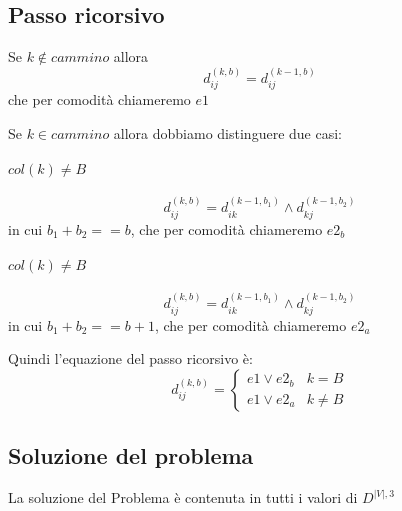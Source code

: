 \documentclass[12pt, a4paper, openany]{book}
\begin{document}
\subsection*{Passo ricorsivo}
Se $k \notin cammino$ allora
\begin{equation*}
	d_{ij}^{(k,b)} = d_{ij}^{(k-1,b)}
\end{equation*}
che per comodità chiameremo $e1$

Se $k \in cammino$ allora dobbiamo distinguere due casi:
\paragraph{$col(k) \neq B$}
\begin{equation*}
	d_{ij}^{(k,b)} = d_{ik}^{(k-1,b_1)} \land d_{kj}^{(k-1,b_2)}
\end{equation*}
in cui $b_1 + b_2 == b$, che per comodità chiameremo $e2_b$
\paragraph{$col(k) \neq B$}
\begin{equation*}
	d_{ij}^{(k,b)} = d_{ik}^{(k-1,b_1)} \land d_{kj}^{(k-1,b_2)}
\end{equation*}
in cui $b_1 + b_2 == b+1$, che per comodità chiameremo $e2_a$

Quindi l'equazione del passo ricorsivo è:
\begin{equation*}
	d^{(k,b)}_{ij} = \begin{cases}
		e1 \lor e2_b & k=B     \\
		e1 \lor e2_a & k\neq B
	\end{cases}
\end{equation*}

\subsection*{Soluzione del problema}
La soluzione del Problema è contenuta in tutti i valori di $D^{|V|,3}$
\end{document}
